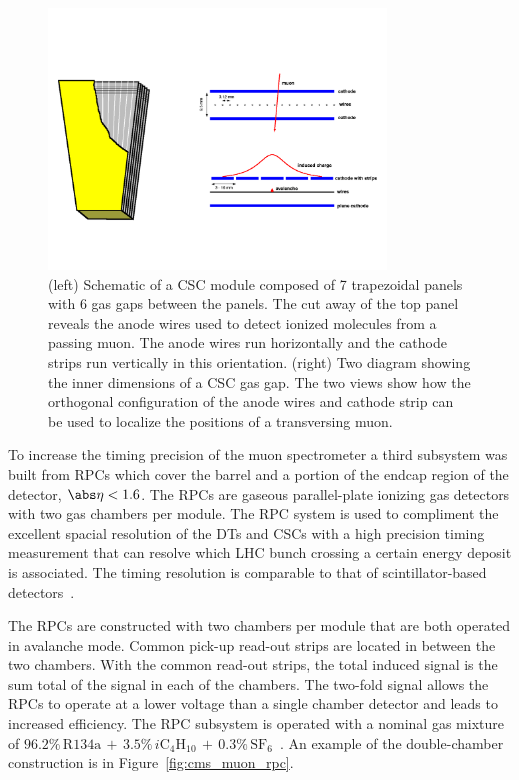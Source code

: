 \begin{figure}[htbp]
\centering
     \includegraphics[width=0.8\textwidth]{cms_and_lhc/plots/cms_muon_csc2.pdf}
     \caption{
(left) Schematic of a CSC module composed of 7 trapezoidal panels with 6 gas gaps between
the panels. The cut away of the top panel reveals the anode wires used to 
detect ionized molecules from a passing muon. The anode wires run horizontally and 
the cathode strips run vertically in this orientation.
(right) Two diagram showing the inner dimensions of a CSC gas gap. The two views
show how the orthogonal configuration of the anode wires and cathode strip can be used
to localize the positions of a transversing muon.
     }
     \label{fig:cms_muon_csc}
\end{figure}

To increase the timing precision of the muon spectrometer a third subsystem was
built from RPCs which cover the barrel and a portion of the endcap
region of the detector, $\abs\eta < 1.6$. The RPCs are gaseous parallel-plate ionizing gas 
detectors with two gas chambers per module. The RPC system is used to compliment the excellent spacial resolution of the
DTs and CSCs with a high precision timing measurement that can resolve which LHC bunch
crossing a certain energy deposit is associated. The timing resolution is comparable
to that of scintillator-based detectors~\cite{rpc_dev}.

The RPCs are constructed with two chambers per module that are both operated in avalanche mode.
Common pick-up read-out strips are located in between the two chambers. With the common
 read-out strips, the total induced signal is the sum total of the signal in each of the
chambers. The two-fold signal allows the RPCs to operate at a lower voltage than a single
chamber detector and leads to increased efficiency. 
The RPC subsystem is operated with a nominal gas mixture of 
$96.2\% \, \textrm{R134a} \, + \, 3.5\% \, i\textrm{C}_{4}\textrm{H}_{10} \, + \, 0.3\% \, \textrm{SF}_{6}$~\cite{CMS-Proposal}.
An example of the
double-chamber construction is in Figure~\ref{fig:cms_muon_rpc}.

